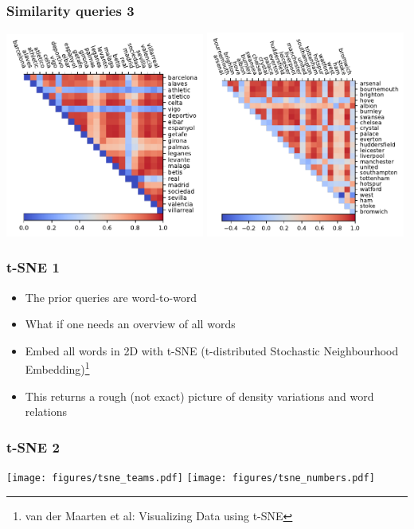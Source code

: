 \documentclass{beamer}
\begin{document}
\begin{frame}
\frametitle{Similarity queries 3}
\includegraphics[width=0.49\textwidth]{figures/simmat_spanish_teams.pdf}
\includegraphics[width=0.49\textwidth]{figures/simmat_english_teams.pdf}
\end{frame}

\begin{frame}
\frametitle{t-SNE 1}
\begin{itemize}
\item The prior queries are word-to-word
\item What if one needs an overview of all words
\item Embed all words in 2D with t-SNE (t-distributed Stochastic Neighbourhood Embedding)\footnote{van der Maarten et al: Visualizing Data using t-SNE}
\item This returns a rough (not exact) picture of density variations and word relations
\end{itemize}
\end{frame}

\begin{frame}
\frametitle{t-SNE 2}
\texttt{[image: figures/tsne\_teams.pdf]}
\texttt{[image: figures/tsne\_numbers.pdf]}
\end{frame}
\end{document}
